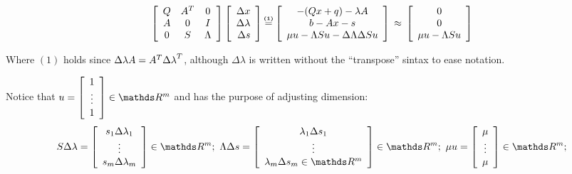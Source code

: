 \documentclass[ComputationalMathematics.tex]{subfiles}
\begin{document}
\begin{equation}\label{eq:14dic1}
  \left[\begin{array}{ccc}
    Q & A^T & 0 \\ A & 0 & I \\ 0 & S & \Lambda
  \end{array}\right]
  \left[\begin{array}{r}
    \Delta x \\ \Delta \lambda \\ \Delta s
  \end{array}\right]
  \numeq{(1)}
  \left[\begin{array}{c}
    - ( Q x + q ) - \lambda A \\
    b - A x - s \\
    \mu u - \Lambda S u - \Delta \Lambda \Delta S u
  \end{array}\right]
  \,\approx\,
  \left[\begin{array}{c}
    0 \\
    0 \\
    \mu u - \Lambda S u
  \end{array}\right]
\end{equation}

Where $(1)$ holds since $\Delta \lambda A = {A}^{T} {\Delta \lambda}^{T}$, although $\Delta \lambda$ is written without the ``transpose'' sintax to ease notation.

Notice that $u= 
\left[\begin{array}{c}
1\\
\vdots\\
1
\end{array}\right]\in \R^m$ and has the purpose of adjusting dimension: 
\[
  S \Delta \lambda = \left[\begin{array}{c}
  s_1 {\Delta \lambda}_1\\
\vdots\\
  s_m {\Delta \lambda}_m\\
\end{array}\right] \in \R^m;~
\Lambda \Delta s = \left[\begin{array}{c}
  \lambda_1 {\Delta s}_1\\
\vdots\\
  \lambda_m {\Delta s}_m \in \R^m\\
\end{array}\right] \in \R^m;~
\mu u =  \left[\begin{array}{c}
  \mu\\
\vdots\\
  \mu\\
\end{array}\right] \in \R^m;
\]
\end{document}
